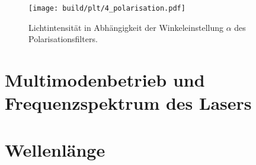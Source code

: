 \begin{figure}
  \centering
   \texttt{[image: build/plt/4\_polarisation.pdf]}
   \caption{Lichtintensität in Abhängigkeit der Winkeleinstellung $\alpha$ des Polarisationsfilters.}
   \label{fig:plt:polarisation}
\end{figure}


\section{Multimodenbetrieb und Frequenzspektrum des Lasers}


\section{Wellenlänge}
\lipsum[1]

